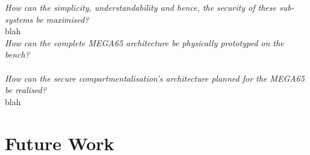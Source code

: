 \textit{How can the simplicity, understandability and hence, the security of these sub-systems be maximised?}\\
blah
\\
\textit{How can the complete MEGA65 architecture be physically prototyped on the bench?}\\

\\
\textit{How can the secure compartmentalisation's architecture planned for the MEGA65 be realised?}\\
blah
\\



\section{Future Work}
